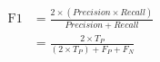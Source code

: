 \begin{equation}
  \label{eqn:f1_score}
  \begin{split}
    \text{F1} &= \frac{2 \times (Precision \times Recall)}{Precision
    + Recall} \\
    &= \frac{2 \times T_P}{(2 \times T_P) + F_P + F_N}
  \end{split}
\end{equation}
